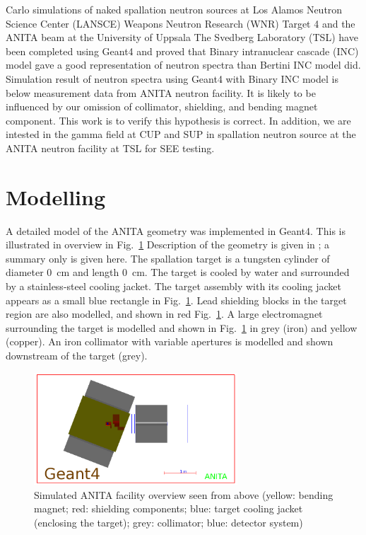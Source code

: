 \documentclass[12pt,journal]{IEEEtran}
\let\MYoriglatexcaption\caption
\renewcommand{\caption}[2][\relax]{\MYoriglatexcaption[#2]{#2}}
\begin{document}
 Carlo simulations of naked spallation neutron sources at Los Alamos Neutron Science Center (LANSCE) Weapons Neutron Research (WNR) Target 4\cite{Wender87} and the ANITA beam at the University of Uppsala The Svedberg Laboratory (TSL) have been completed using Geant4 and proved that Binary intranuclear cascade (INC) model gave a good representation of neutron spectra than Bertini INC model did\cite{Platt13}. Simulation result of neutron spectra using Geant4 with Binary INC model is below measurement data from ANITA neutron facility. It is likely to be influenced by our omission of collimator, shielding, and bending magnet component. This work is to verify this hypothesis is correct. In addition, we are intested in the gamma field at CUP and SUP in spallation neutron source at the ANITA neutron facility at TSL for SEE testing.

\section{Modelling}

A detailed model of the ANITA geometry was implemented in Geant4.
This is illustrated in overview in Fig.~\ref{fig:ANITAoverview}
Description of the geometry is given in \cite{Prokofiev2009,Prokofiev14}; a summary only is given here.
The spallation target is a tungsten cylinder of diameter \SI{0}{\cm} and length \SI{0}{\cm}.
The target is cooled by water and surrounded by a stainless-steel cooling jacket.
The target assembly with its cooling jacket appears as a small blue rectangle in Fig.~\ref{fig:ANITAoverview}.
Lead shielding blocks in the target region are also modelled, and shown in red Fig.~\ref{fig:ANITAoverview}.
A large electromagnet surrounding the target is modelled and shown in Fig.~\ref{fig:ANITAoverview} in grey (iron) and yellow (copper).
An iron collimator with variable apertures is modelled  and shown downstream of the target (grey).

\begin{figure}[!t]
	\centering
	\includegraphics[width=3in]{overview.png}
	\caption{Simulated ANITA facility overview seen from above (yellow: bending magnet; red: shielding components; blue: target cooling jacket (enclosing the target); grey: collimator; blue: detector system)}
	\label{fig:ANITAoverview}
\end{figure}
\end{document}
